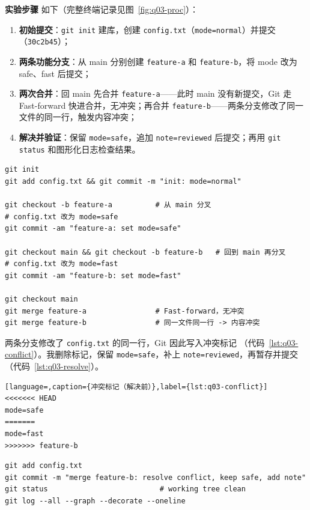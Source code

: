 \documentclass[12pt,a4paper,fontset=fandol]{ctexart}
\begin{document}
\textbf{实验步骤} 如下（完整终端记录见图~\ref{fig:q03-proc}）：
\begin{enumerate}[nosep]
  \item \textbf{初始提交}：\texttt{git init} 建库，创建 \texttt{config.txt}（\texttt{mode=normal}）并提交（\texttt{30c2b45}）；
  \item \textbf{两条功能分支}：从 main 分别创建 \texttt{feature-a} 和 \texttt{feature-b}，将 mode 改为 safe、fast 后提交；
  \item \textbf{两次合并}：回 main 先合并 \texttt{feature-a}——此时 main 没有新提交，Git 走 Fast-forward 快进合并，无冲突；再合并 \texttt{feature-b}——两条分支修改了同一文件的同一行，触发内容冲突；
  \item \textbf{解决并验证}：保留 \texttt{mode=safe}，追加 \texttt{note=reviewed} 后提交；再用 \texttt{git status} 和图形化日志检查结果。
\end{enumerate}

\begin{lstlisting}[language=shell,caption={q03 关键命令：分支、合并与冲突解决},label={lst:q03}]
git init
git add config.txt && git commit -m "init: mode=normal"

git checkout -b feature-a          # 从 main 分叉
# config.txt 改为 mode=safe
git commit -am "feature-a: set mode=safe"

git checkout main && git checkout -b feature-b   # 回到 main 再分叉
# config.txt 改为 mode=fast
git commit -am "feature-b: set mode=fast"

git checkout main
git merge feature-a                # Fast-forward，无冲突
git merge feature-b                # 同一文件同一行 -> 内容冲突
\end{lstlisting}

两条分支修改了 \texttt{config.txt} 的同一行，Git 因此写入冲突标记
（代码~\ref{lst:q03-conflict}）。我删除标记，保留 \texttt{mode=safe}，补上
\texttt{note=reviewed}，再暂存并提交（代码~\ref{lst:q03-resolve}）。

\begin{lstlisting}[language=,caption={冲突标记（解决前）},label={lst:q03-conflict}]
<<<<<<< HEAD
mode=safe
=======
mode=fast
>>>>>>> feature-b
\end{lstlisting}

\begin{lstlisting}[language=shell,caption={q03 冲突解决与验证},label={lst:q03-resolve}]
git add config.txt
git commit -m "merge feature-b: resolve conflict, keep safe, add note"
git status                          # working tree clean
git log --all --graph --decorate --oneline
\end{lstlisting}
\end{document}
